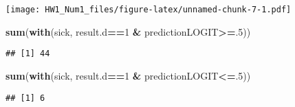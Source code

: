 \documentclass[]{article}
\newenvironment{Shaded}{\begin{snugshade}}{\end{snugshade}}
\newcommand{\KeywordTok}[1]{\textcolor[rgb]{0.13,0.29,0.53}{\textbf{#1}}}
\newcommand{\DataTypeTok}[1]{\textcolor[rgb]{0.13,0.29,0.53}{#1}}
\newcommand{\DecValTok}[1]{\textcolor[rgb]{0.00,0.00,0.81}{#1}}
\newcommand{\StringTok}[1]{\textcolor[rgb]{0.31,0.60,0.02}{#1}}
\newcommand{\ControlFlowTok}[1]{\textcolor[rgb]{0.13,0.29,0.53}{\textbf{#1}}}
\newcommand{\OperatorTok}[1]{\textcolor[rgb]{0.81,0.36,0.00}{\textbf{#1}}}
\newcommand{\NormalTok}[1]{#1}
\begin{document}
\texttt{[image: HW1\_Num1\_files/figure-latex/unnamed-chunk-7-1.pdf]}

\begin{Shaded}
\end{Shaded}

\begin{Shaded}
\begin{Highlighting}[]
\KeywordTok{sum}\NormalTok{(}\KeywordTok{with}\NormalTok{(sick, result.d}\OperatorTok{==}\DecValTok{1} \OperatorTok{&}\StringTok{ }\NormalTok{predictionLOGIT}\OperatorTok{>=}\NormalTok{.}\DecValTok{5}\NormalTok{))}
\end{Highlighting}
\end{Shaded}

\begin{verbatim}
## [1] 44
\end{verbatim}

\begin{Shaded}
\begin{Highlighting}[]
\KeywordTok{sum}\NormalTok{(}\KeywordTok{with}\NormalTok{(sick, result.d}\OperatorTok{==}\DecValTok{1} \OperatorTok{&}\StringTok{ }\NormalTok{predictionLOGIT}\OperatorTok{<=}\NormalTok{.}\DecValTok{5}\NormalTok{))}
\end{Highlighting}
\end{Shaded}

\begin{verbatim}
## [1] 6
\end{verbatim}
\end{document}
